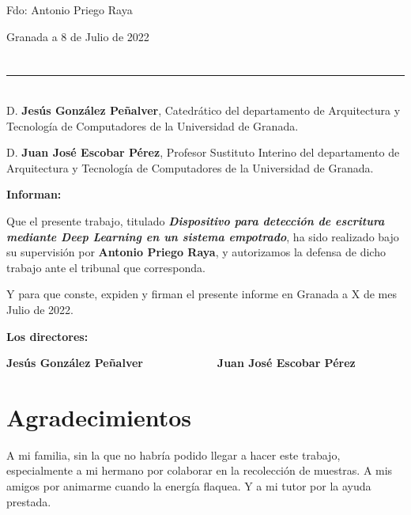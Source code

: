 \vspace{6cm}

\noindent Fdo: Antonio Priego Raya

\vspace{2cm}

\begin{flushright}
Granada a 8 de Julio de 2022
\end{flushright}


\chapter*{}
\thispagestyle{empty}

\noindent\rule[-1ex]{\textwidth}{2pt}\\[4.5ex]

D. \textbf{Jesús González Peñalver}, Catedrático del departamento de Arquitectura y Tecnología de Computadores de la Universidad de Granada.

\vspace{0.5cm}

D. \textbf{Juan José Escobar Pérez}, Profesor Sustituto Interino del departamento de Arquitectura y Tecnología de Computadores de la Universidad de Granada.

\vspace{0.5cm}

\textbf{Informan:}

\vspace{0.5cm}

Que el presente trabajo, titulado \textit{\textbf{Dispositivo para detección de escritura mediante Deep Learning en
un sistema empotrado}},
ha sido realizado bajo su supervisión por \textbf{Antonio Priego Raya}, y autorizamos la defensa de dicho trabajo ante el tribunal
que corresponda.

\vspace{0.5cm}

Y para que conste, expiden y firman el presente informe en Granada a X de mes Julio de 2022.

\vspace{1cm}

\textbf{Los directores:}

\vspace{5cm}

\noindent \textbf{Jesús González Peñalver \ \ \ \ \ \ \ \ \ \ \ Juan José Escobar Pérez}

\chapter*{Agradecimientos}
\thispagestyle{empty}

       \vspace{1cm}


A mi familia, sin la que no habría podido llegar a hacer este trabajo, especialmente
a mi hermano por colaborar en la recolección de muestras. A mis amigos
por animarme cuando la energía flaquea. Y a mi tutor por la ayuda prestada.